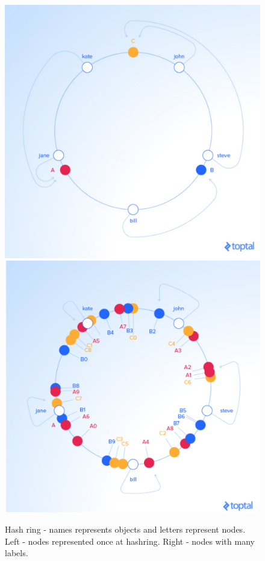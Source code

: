 \begin{figure}[h] %
        \includegraphics[scale=0.35]{thesis/figures/hashring.png}  
        \includegraphics[scale=0.35]{thesis/figures/vnodes.png}
    \caption{Hash ring - names represents objects and letters represent nodes. 
            Left - nodes represented once at hashring.
            Right - nodes with many labels. \cite{ConsistentHashing}}
\end{figure}

